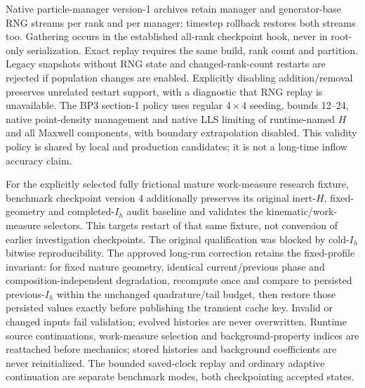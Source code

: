 \documentclass[11pt]{article}
\begin{document}
Native particle-manager version-1 archives retain manager and generator-base RNG
streams per rank and per manager; timestep rollback restores both streams too.
Gathering occurs in the established all-rank checkpoint hook, never in root-only
serialization. Exact replay requires the same build, rank count and partition.
Legacy snapshots without RNG state and changed-rank-count restarts are rejected
if population changes are enabled. Explicitly disabling addition/removal preserves
unrelated restart support, with a diagnostic that RNG replay is unavailable.
The BP3 section-1 policy uses regular $4\times4$ seeding, bounds 12--24, native
point-density management and native LLS limiting of runtime-named $H$ and all
Maxwell components, with boundary extrapolation disabled. This validity policy
is shared by local and production candidates; it is not a long-time inflow
accuracy claim.

For the explicitly selected fully frictional mature work-measure research
fixture, benchmark checkpoint version 4 additionally preserves its original
inert-$H$, fixed-geometry and completed-$I_h$ audit baseline and validates
the kinematic/work-measure selectors. This targets restart of that same
fixture, not conversion of earlier investigation checkpoints. The original
qualification was blocked by cold-$I_h$ bitwise reproducibility. The approved
long-run correction retains the fixed-profile invariant: for fixed mature
geometry, identical current/previous phase and composition-independent
degradation, recompute once and compare to persisted previous-$I_h$ within
the unchanged quadrature/tail budget, then restore those persisted values
exactly before publishing the transient cache key. Invalid or changed inputs
fail validation; evolved histories are never overwritten. Runtime source
continuations, work-measure selection and background-property indices are
reattached before mechanics; stored histories and background coefficients are
never reinitialized. The bounded saved-clock replay and ordinary adaptive
continuation are separate benchmark modes, both checkpointing accepted states.
\end{document}
